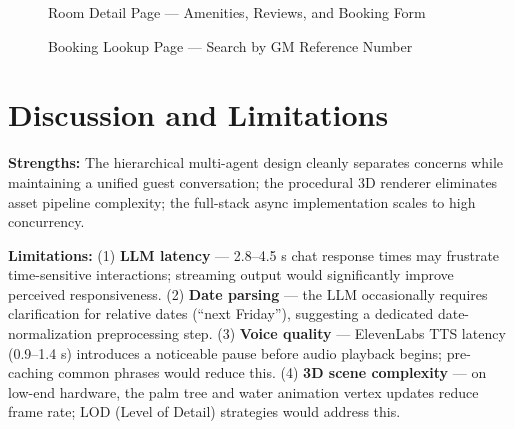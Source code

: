\documentclass[11pt,a4paper]{report}
\begin{document}
\begin{figure}[H]
\centering
\caption{Room Detail Page — Amenities, Reviews, and Booking Form}
\label{fig:room_detail}
\end{figure}

\begin{figure}[H]
\centering
\caption{Booking Lookup Page — Search by GM Reference Number}
\label{fig:booking_lookup}
\end{figure}

\section{Discussion and Limitations}

\textbf{Strengths:} The hierarchical multi-agent design cleanly separates concerns while maintaining a unified guest conversation; the procedural 3D renderer eliminates asset pipeline complexity; the full-stack async implementation scales to high concurrency.

\textbf{Limitations:} (1) \textbf{LLM latency} — 2.8–4.5 s chat response times may frustrate time-sensitive interactions; streaming output would significantly improve perceived responsiveness. (2) \textbf{Date parsing} — the LLM occasionally requires clarification for relative dates (``next Friday''), suggesting a dedicated date-normalization preprocessing step. (3) \textbf{Voice quality} — ElevenLabs TTS latency (0.9–1.4 s) introduces a noticeable pause before audio playback begins; pre-caching common phrases would reduce this. (4) \textbf{3D scene complexity} — on low-end hardware, the palm tree and water animation vertex updates reduce frame rate; LOD (Level of Detail) strategies would address this.

\end{document}
